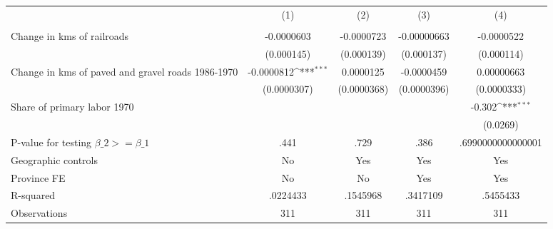 {
\def\sym#1{\ifmmode^{#1}\else\(^{#1}\)\fi}
\begin{tabular}{l*{4}{c}}
\hline\hline
                &\multicolumn{1}{c}{(1)}&\multicolumn{1}{c}{(2)}&\multicolumn{1}{c}{(3)}&\multicolumn{1}{c}{(4)}\\
                &\multicolumn{1}{c}{}&\multicolumn{1}{c}{}&\multicolumn{1}{c}{}&\multicolumn{1}{c}{}\\
\hline
Change in kms of railroads&-0.0000603         &-0.0000723         &-0.00000663         &-0.0000522         \\
                &(0.000145)         &(0.000139)         &(0.000137)         &(0.000114)         \\
[1em]
Change in kms of paved and gravel roads 1986-1970&-0.0000812\sym{***}&0.0000125         &-0.0000459         &0.00000663         \\
                &(0.0000307)         &(0.0000368)         &(0.0000396)         &(0.0000333)         \\
[1em]
Share of primary labor 1970&                  &                  &                  &   -0.302\sym{***}\\
                &                  &                  &                  & (0.0269)         \\
\hline
P-value for testing $\beta\_{2} >= \beta\_{1}$&     .441         &     .729         &     .386         &.6990000000000001         \\
Geographic controls&       No         &      Yes         &      Yes         &      Yes         \\
Province FE     &       No         &       No         &      Yes         &      Yes         \\
R-squared       & .0224433         & .1545968         & .3417109         & .5455433         \\
Observations    &      311         &      311         &      311         &      311         \\
\hline\hline
\end{tabular}
}
